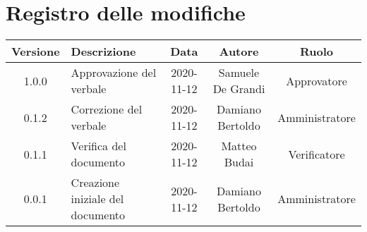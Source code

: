 \section*{Registro delle modifiche}

\begin{center}
	\begin{longtable}{|c|p{5cm}|c|c|c|}
	\hline
	\rowcolor{lighter-grayer}
	\textbf{Versione} & \textbf{Descrizione} & \textbf{Data} & \textbf{Autore} & \textbf{Ruolo} \\
	\hline
	\endfirsthead


	\hline
	1.0.0 & Approvazione del verbale & 2020-11-12 & Samuele De Grandi & Approvatore \\
	\hline
	0.1.2 & Correzione del verbale & 2020-11-12 & Damiano Bertoldo & Amministratore \\
	\hline
	0.1.1 & Verifica del documento & 2020-11-12 & Matteo Budai & Verificatore \\
	\hline
	0.0.1 & Creazione iniziale del documento & 2020-11-12 & Damiano Bertoldo & Amministratore \\
	\hline
	\end{longtable}
\end{center}